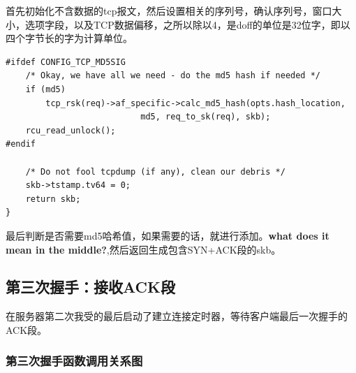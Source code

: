                 首先初始化不含数据的tcp报文，然后设置相关的序列号，确认序列号，窗口大小，选项字段，以及TCP数据偏移，之所以除以4，是doff的单位是32位字，即以四个字节长的字为计算单位。
                
\begin{verbatim}
#ifdef CONFIG_TCP_MD5SIG
    /* Okay, we have all we need - do the md5 hash if needed */
    if (md5)
        tcp_rsk(req)->af_specific->calc_md5_hash(opts.hash_location,
                           md5, req_to_sk(req), skb);
    rcu_read_unlock();
#endif

    /* Do not fool tcpdump (if any), clean our debris */
    skb->tstamp.tv64 = 0;
    return skb;
}
\end{verbatim}

                最后判断是否需要md5哈希值，如果需要的话，就进行添加。\textbf{what does it mean in the middle?},然后返回生成包含SYN+ACK段的skb。     

        \subsection{第三次握手：接收ACK段}

                在服务器第二次我受的最后启动了建立连接定时器，等待客户端最后一次握手的ACK段。           
                \subsubsection{第三次握手函数调用关系图}

